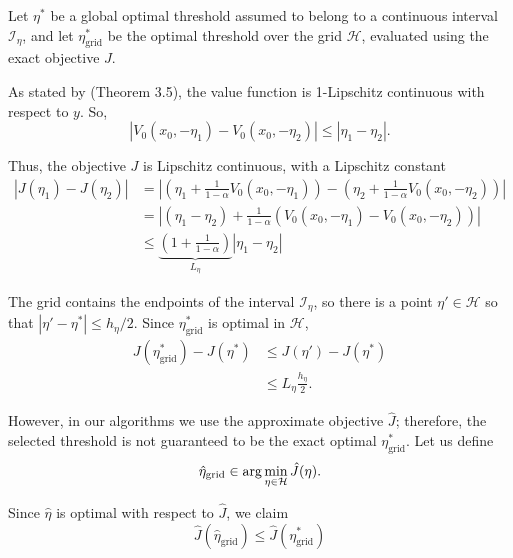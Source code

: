 Let $\eta^*$ be a global optimal threshold assumed to belong to a continuous interval $\mathcal{I}_\eta$, and let $\eta_{\text{grid}}^*$ be the optimal threshold over the grid $\mathcal{H}$, evaluated using the exact objective $J$.

As stated by \cite{bauerle-2011} (Theorem 3.5), the value function is 1-Lipschitz continuous with respect to $y$. So,
\begin{equation}
	|V_0(x_0,-\eta_1)-V_0(x_0,-\eta_2)|
	\leq |\eta_1-\eta_2|.
	\label{value-eta-lipschitz}
\end{equation}

Thus, the objective $J$ is Lipschitz continuous, with a Lipschitz constant
\begin{equation}
	\begin{array}{rl}
		\left| J(\eta_1) - J(\eta_2) \right| &= \left| \left( \eta_1 + \frac{1}{1-\alpha} V_0(x_0, -\eta_1) \right) - \left( \eta_2 + \frac{1}{1-\alpha} V_0(x_0, -\eta_2) \right) \right| \\
		&= \left| (\eta_1 - \eta_2) + \frac{1}{1-\alpha} (V_0(x_0, -\eta_1) - V_0(x_0, -\eta_2)) \right| \\
		& \leq \underbrace{\left( 1 + \frac{1}{1-\alpha} \right)}_{L_{\eta}} |\eta_1 - \eta_2|
	\end{array}
	\label{eta-lipschitz-constant}
\end{equation}

The grid contains the endpoints of the interval $\mathcal{I}_{\eta}$, so there is a point $\eta' \in \mathcal{H}$ so that $|\eta' - \eta^*| \leq h_{\eta}/2$. Since $\eta_{\text{grid}}^*$ is optimal in $\mathcal{H}$,
\begin{equation}
	\begin{array}{rl}
		J(\eta_{\text{grid}}^*)-J(\eta^*)
		&\displaystyle\leq J(\eta')-J(\eta^*)\\[4pt]
		&\displaystyle\leq L_\eta\frac{h_\eta}{2}.
	\end{array}
	\label{eta-grid-error}
\end{equation}

However, in our algorithms we use the approximate objective $\hat{J}$; therefore, the selected threshold is not guaranteed to be the exact optimal $\eta_{\text{grid}}^*$. Let us define
\begin{equation}
	\hat{\eta}_{\text{grid}} \in \arg\min_{\eta\in\mathcal{H}}\hat{J}(\eta).
	\notag
	\label{approx-eta-minimizer}
\end{equation}

Since $\hat{\eta}$ is optimal with respect to $\hat{J}$, we claim
\begin{equation}
	\hat{J}(\hat{\eta}_{\text{grid}}) \leq \hat{J}(\eta_{\text{grid}}^*)
	\label{approx-eta-optimality}
\end{equation}

